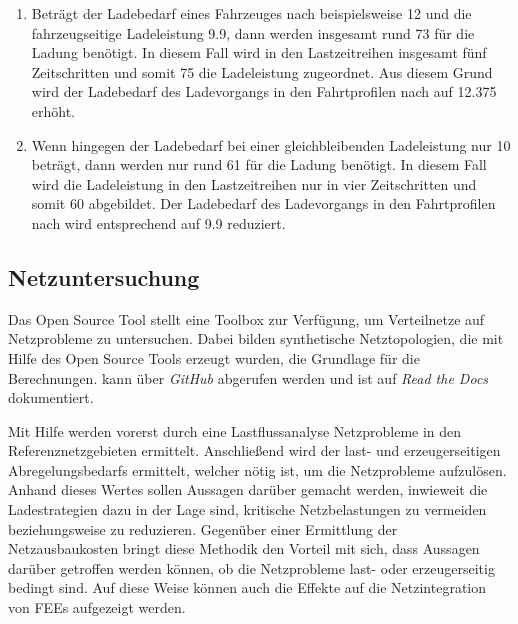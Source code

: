 \begin{enumerate}
	\item Beträgt der Ladebedarf eines Fahrzeuges nach  beispielsweise \SI{12}{\kwh} und die fahrzeugseitige Ladeleistung \SI{9.9}{\kw}, dann werden insgesamt rund \SI{73}{\Minuten} für die Ladung benötigt. In diesem Fall wird in den Lastzeitreihen insgesamt fünf Zeitschritten und somit \SI{75}{\Minuten} die Ladeleistung zugeordnet. Aus diesem Grund wird der Ladebedarf des Ladevorgangs in den Fahrtprofilen nach  auf \SI{12.375}{\kwh} erhöht.
	\item Wenn hingegen der Ladebedarf bei einer gleichbleibenden Ladeleistung nur \SI{10}{\kwh} beträgt, dann werden nur rund \SI{61}{\Minuten} für die Ladung benötigt. In diesem Fall wird die Ladeleistung in den Lastzeitreihen nur in vier Zeitschritten und somit \SI{60}{\Minuten} abgebildet. Der Ladebedarf des Ladevorgangs in den Fahrtprofilen nach  wird entsprechend auf \SI{9.9}{\kwh} reduziert.
\end{enumerate}


\subsection{Netzuntersuchung}\label{chap:edisgo_theo}

Das Open Source Tool  stellt eine Toolbox zur Verfügung, um Verteilnetze auf Netzprobleme zu untersuchen.
Dabei bilden synthetische Netztopologien, die mit Hilfe des Open Source Tools  erzeugt wurden, die Grundlage für die Berechnungen.
 kann über \textit{GitHub} \cite{edisgoGit2019} abgerufen werden und ist auf \textit{Read the Docs} \cite{edisgoDocs2017} dokumentiert.\medskip

Mit Hilfe  werden vorerst durch eine Lastflussanalyse Netzprobleme in den Referenznetzgebieten ermittelt.
Anschließend wird der last- und erzeugerseitigen Abregelungsbedarfs ermittelt, welcher nötig ist, um die Netzprobleme aufzulösen.
Anhand dieses Wertes sollen Aussagen darüber gemacht werden, inwieweit die Ladestrategien dazu in der Lage sind, kritische Netzbelastungen zu vermeiden beziehungsweise zu reduzieren.
Gegenüber einer Ermittlung der Netzausbaukosten bringt diese Methodik den Vorteil mit sich, dass Aussagen darüber getroffen werden können, ob die Netzprobleme last- oder erzeugerseitig bedingt sind.
Auf diese Weise können auch die Effekte auf die Netzintegration von \glspl{FEE} aufgezeigt werden.



